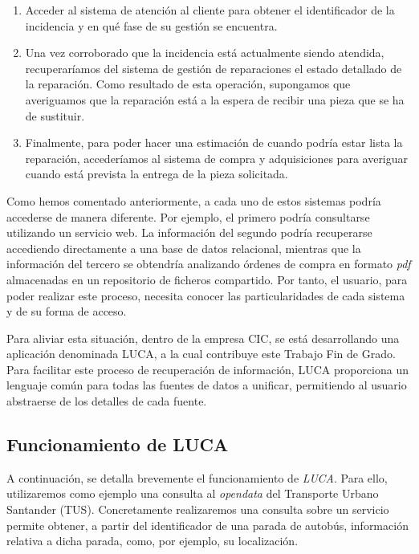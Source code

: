 \begin{enumerate}
	\item Acceder al sistema de atención al cliente para obtener el identificador de la incidencia y en qué fase de su gestión se encuentra.
	\item Una vez corroborado que la incidencia está actualmente siendo atendida, recuperaríamos del sistema de gestión de reparaciones el estado detallado de la reparación. Como resultado de esta operación, supongamos que averiguamos que la reparación está a la espera de recibir una pieza que se ha de sustituir.
	\item Finalmente, para poder hacer una estimación de cuando podría estar lista la reparación, accederíamos al sistema de compra y adquisiciones para averiguar cuando está prevista la entrega de la pieza solicitada.
\end{enumerate}

Como hemos comentado anteriormente, a cada uno de estos sistemas podría accederse de manera diferente. Por ejemplo, el primero podría consultarse utilizando un servicio web. La información del segundo podría recuperarse accediendo directamente a una base de datos relacional, mientras que la información del tercero se obtendría analizando órdenes de compra en formato \emph{pdf} almacenadas en un repositorio de ficheros compartido. Por tanto, el usuario, para poder realizar este proceso, necesita conocer las particularidades de cada sistema y de su forma de acceso.

Para aliviar esta situación, dentro de la empresa CIC, se está desarrollando una aplicación denominada LUCA, a la cual contribuye este Trabajo Fin de Grado. Para facilitar este proceso de recuperación de información, LUCA proporciona un lenguaje común para todas las fuentes de datos a unificar, permitiendo al usuario abstraerse de los detalles de cada fuente.

\subsection{Funcionamiento de LUCA}

A continuación, se detalla brevemente el funcionamiento de \emph{LUCA}. Para ello, utilizaremos como ejemplo una consulta al \emph{opendata} del Transporte Urbano Santander (TUS). Concretamente realizaremos una consulta sobre un servicio permite obtener, a partir del identificador de una parada de autobús, información relativa a dicha parada, como, por ejemplo, su localización.

